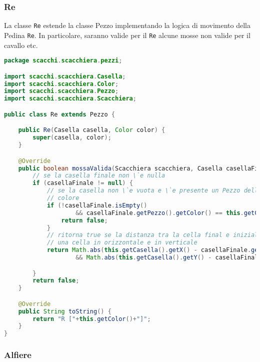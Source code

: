 \documentclass{article}
\begin{document}
\subsubsection{Re}
La classe \texttt{Re} estende la classe Pezzo implementando la logica di movimento della Pedina \texttt{Re}. In particolare, saranno valide per il \texttt{Re} alcune mosse non valide per il cavallo etc.
\begin{lstlisting}[language=Java,escapechar=|]
package scacchi.scacchiera.pezzi;

import scacchi.scacchiera.Casella;
import scacchi.scacchiera.Color;
import scacchi.scacchiera.Pezzo;
import scacchi.scacchiera.Scacchiera;

public class Re extends Pezzo {

	public Re(Casella casella, Color color) {
		super(casella, color);
	}

	@Override
	public boolean mossaValida(Scacchiera scacchiera, Casella casellaFinale) {
		// se la casella finale non \`e nulla
		if (casellaFinale != null) {
			// se la casella non \`e vuota e \`e presente un Pezzo dello stesso
			// colore
			if (!casellaFinale.isEmpty()
					&& casellaFinale.getPezzo().getColor() == this.getColor()) {
				return false;
			}
			// ritorna true se la distanza tra la cella final e iniziale \`e di
			// una cella in orizzontale e in verticale
			return Math.abs(this.getCasella().getX() - casellaFinale.getX()) <= 1
					&& Math.abs(this.getCasella().getY() - casellaFinale.getY()) <= 1;

		}
		return false;
	}

	@Override
	public String toString() {
		return "R ["+this.getColor()+"]";
	}
}
\end{lstlisting}

\subsubsection{Alfiere}
\end{document}
